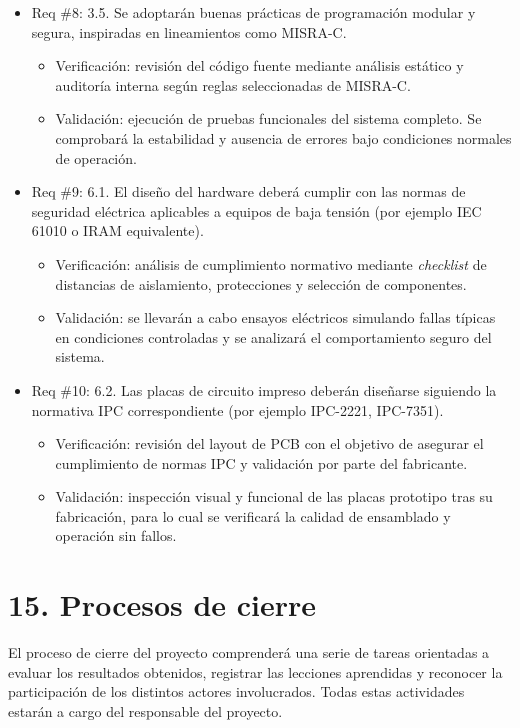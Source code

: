 \documentclass[
11pt, %
]{charter}
\begin{document}
\begin{itemize}
	\item Req \#8: 3.5. Se adoptarán buenas prácticas de programación modular y segura, inspiradas en lineamientos como MISRA-C.
	\begin{itemize}
		\item Verificación: revisión del código fuente mediante análisis estático y auditoría interna según reglas seleccionadas de MISRA-C.
		\item Validación: ejecución de pruebas funcionales del sistema completo. Se comprobará la estabilidad y ausencia de errores bajo condiciones normales de operación.
	\end{itemize}
	
	\item Req \#9: 6.1. El diseño del hardware deberá cumplir con las normas de seguridad eléctrica aplicables a equipos de baja tensión (por ejemplo IEC 61010 o IRAM equivalente).
	\begin{itemize}
		\item Verificación: análisis de cumplimiento normativo mediante \textit{checklist} de distancias de aislamiento, protecciones y selección de componentes.
		\item Validación: se llevarán a cabo ensayos eléctricos simulando fallas típicas en condiciones controladas y se analizará el comportamiento seguro del sistema.
	\end{itemize}
	
	\item Req \#10: 6.2. Las placas de circuito impreso deberán diseñarse siguiendo la normativa IPC correspondiente (por ejemplo IPC-2221, IPC-7351).
	\begin{itemize}
		\item Verificación: revisión del layout de PCB con el objetivo de asegurar el cumplimiento de normas IPC y validación por parte del fabricante.
		\item Validación: inspección visual y funcional de las placas prototipo tras su fabricación, para lo cual se verificará la calidad de ensamblado y operación sin fallos.
	\end{itemize}
\end{itemize}

\newpage
\section{15. Procesos de cierre}    
\label{sec:cierre}

El proceso de cierre del proyecto comprenderá una serie de tareas orientadas a evaluar los resultados obtenidos, registrar las lecciones aprendidas y reconocer la participación de los distintos actores involucrados. Todas estas actividades estarán a cargo del responsable del proyecto.
\end{document}

